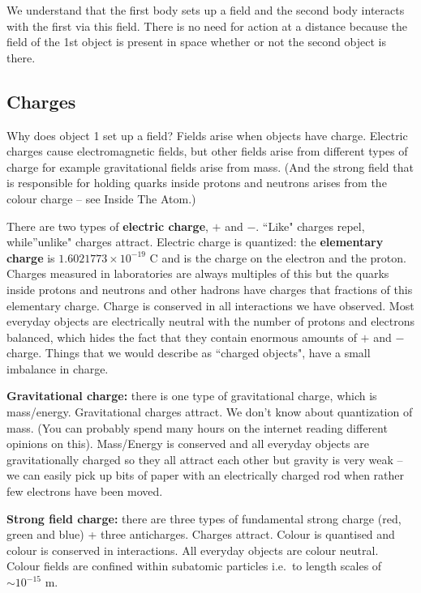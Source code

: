 \documentclass[
  letterpaper,
  DIV=11,
  numbers=noendperiod]{scrreprt}
\begin{document}
We understand that the first body sets up a field and the second body
interacts with the first via this field. There is no need for action at
a distance because the field of the 1st object is present in space
whether or not the second object is there.

\subsection{Charges}\label{charges}

Why does object 1 set up a field? Fields arise when objects have charge.
Electric charges cause electromagnetic fields, but other fields arise
from different types of charge for example gravitational fields arise
from mass. (And the strong field that is responsible for holding quarks
inside protons and neutrons arises from the colour charge -- see Inside
The Atom.)

There are two types of \textbf{electric charge}, \(+\) and \(-\).
``Like" charges repel, while''unlike" charges attract. Electric charge
is quantized: the \textbf{elementary charge} is
\(1.6021773 \times 10^{-19}\) C and is the charge on the electron and
the proton. Charges measured in laboratories are always multiples of
this but the quarks inside protons and neutrons and other hadrons have
charges that fractions of this elementary charge. Charge is conserved in
all interactions we have observed. Most everyday objects are
electrically neutral with the number of protons and electrons balanced,
which hides the fact that they contain enormous amounts of \(+\) and
\(-\) charge. Things that we would describe as ``charged objects", have
a small imbalance in charge.

\textbf{Gravitational charge:} there is one type of gravitational
charge, which is mass/energy. Gravitational charges attract. We don't
know about quantization of mass. (You can probably spend many hours on
the internet reading different opinions on this). Mass/Energy is
conserved and all everyday objects are gravitationally charged so they
all attract each other but gravity is very weak -- we can easily pick up
bits of paper with an electrically charged rod when rather few electrons
have been moved.

\textbf{Strong field charge:} there are three types of fundamental
strong charge (red, green and blue) + three anticharges. Charges
attract. Colour is quantised and colour is conserved in interactions.
All everyday objects are colour neutral. Colour fields are confined
within subatomic particles i.e.~to length scales of \(\sim 10^{-15}\) m.
\end{document}
